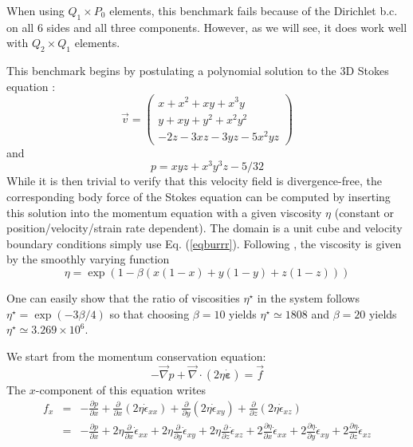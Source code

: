 

When using $Q_1 \times P_0$ elements, this benchmark fails 
 because of the Dirichlet b.c. on all 6 sides and all three components.
However, as we will see, it does work well with $Q_2 \times Q_1$ elements. 

This benchmark begins by postulating a polynomial solution to the 3D Stokes equation \cite{dobo04}:
\begin{equation}
\vec{v}
=
\left(
\begin{array}{c}
x+x^2+xy+x^3y \\
y + xy + y^2 + x^2 y^2\\
-2z - 3xz - 3yz - 5x^2 yz
\end{array}
\right)
\label{eqburrr}
\end{equation}
and
\begin{equation}
p = xyz + x^3 y^3z - 5/32
\end{equation}
While it is then trivial to verify that this velocity field is divergence-free,  
the corresponding body force of the Stokes equation can be computed by 
inserting this solution into the momentum equation with a given viscosity $\eta$
(constant or position/velocity/strain rate dependent). 
The domain is a unit cube and velocity boundary conditions 
simply use Eq. (\ref{eqburrr}). 
Following \cite{busa13}, the viscosity
is given by the smoothly varying function
\begin{equation}
\eta = \exp(1 - \beta(x(1 - x) + y(1 - y) + z(1 - z)))
\end{equation}

One can easily show that the ratio of viscosities $\eta^\star$
in the system follows $\eta^\star=\exp(-3\beta/4)$ so that choosing $\beta=10$ yields
$\eta^\star\simeq 1808$ and $\beta=20$ yields $\eta^\star\simeq 3.269\times10^6$.


We start from the momentum conservation equation:
\[
-{\vec \nabla}p + {\vec \nabla}\cdot (2 \eta \dot{\bm \varepsilon}) = {\vec f}
\]
The $x$-component of this equation writes
\begin{eqnarray}
f_x 
&=& -\frac{\partial p}{\partial x} 
+\frac{\partial}{\partial x} (2\eta \dot{\epsilon}_{xx})
+\frac{\partial}{\partial y} (2\eta \dot{\epsilon}_{xy})
+\frac{\partial}{\partial z} (2\eta \dot{\epsilon}_{xz}) \\
&=& 
-\frac{\partial p}{\partial x} 
+2\eta\frac{\partial}{\partial x} \dot{\epsilon}_{xx}
+2\eta\frac{\partial}{\partial y} \dot{\epsilon}_{xy}
+2\eta\frac{\partial}{\partial z} \dot{\epsilon}_{xz} 
+2\frac{\partial \eta}{\partial x} \dot{\epsilon}_{xx}
+2\frac{\partial \eta}{\partial y} \dot{\epsilon}_{xy}
+2\frac{\partial \eta}{\partial z} \dot{\epsilon}_{xz} 
\end{eqnarray}


